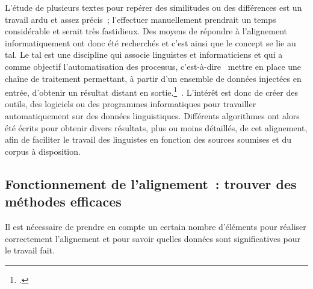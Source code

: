 L'étude de plusieurs textes pour repérer des similitudes ou des différences est un travail ardu et assez précis~; l'effectuer manuellement prendrait un temps considérable et serait très fastidieux. Des moyens de répondre à l'alignement informatiquement ont donc été recherchés et c'est ainsi que le concept se lie au \acrshort{tal}. Le \acrshort{tal} est une discipline qui associe linguistes et informaticiens et qui a comme objectif l'automatisation des processus, c'est-à-dire \og~mettre en place une chaîne de traitement permettant, à partir d'un ensemble de données injectées en entrée, d'obtenir un résultat distant en sortie.\footcite[p.~1022]{tal_etude_comparee}~\fg{}. L'intérêt est donc de créer des outils, des logiciels ou des programmes informatiques pour travailler automatiquement sur des données linguistiques. Différents algorithmes ont alors été écrits pour obtenir divers résultats, plus ou moins détaillés, de cet alignement, afin de faciliter le travail des linguistes en fonction des sources soumises et du corpus à disposition.

\subsection{Fonctionnement de l'alignement~: trouver des méthodes efficaces}
Il est nécessaire de prendre en compte un certain nombre d'éléments pour réaliser correctement l'alignement et pour savoir quelles données sont significatives pour le travail fait. 

